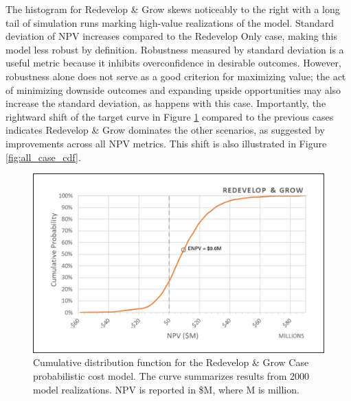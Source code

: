 The histogram for Redevelop \& Grow skews noticeably to the right with a long tail of simulation runs marking high-value realizations of the model. Standard deviation of NPV increases compared to the Redevelop Only case, making this model less robust by definition. Robustness measured by standard deviation is a useful metric because it inhibits overconfidence in desirable outcomes. However, robustness alone does not serve as a good criterion for maximizing value; the act of minimizing downside outcomes and expanding upside opportunities may also increase the standard deviation, as happens with this case. Importantly, the rightward shift of the target curve in Figure \ref{fig:grow_case_cdf} compared to the previous cases indicates Redevelop \& Grow dominates the other scenarios, as suggested by improvements across all NPV metrics. This shift is also illustrated in Figure \ref{fig:all_case_cdf}. 

\begin{figure}
\centering
\includegraphics[width=.8\textwidth]{templates/images/Figure-Grow_Case_CDF.png}
\caption[Redevelop \& Grow Case CDF]{Cumulative distribution function for the Redevelop \& Grow Case probabilistic cost model. The curve summarizes results from 2000 model realizations. NPV is reported in \$M, where M is million.}
\label{fig:grow_case_cdf}
\end{figure}

